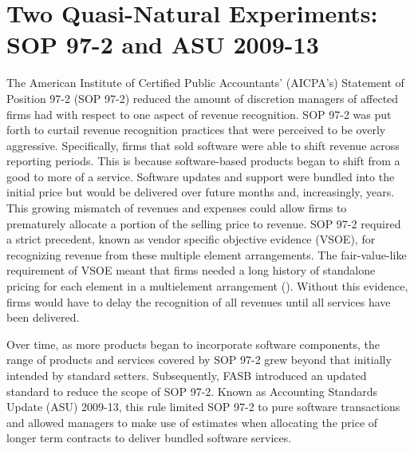 \documentclass[thesis]{thesis-umich}
\begin{document}
\section{Two Quasi-Natural Experiments: SOP 97-2 and ASU 2009-13}\label{sec:experiments}
The American Institute of Certified Public Accountants' (AICPA's) Statement of Position 97-2 (SOP 97-2) reduced the amount of discretion managers of affected firms had with respect to one aspect of revenue recognition. 
SOP 97-2 was put forth to curtail revenue recognition practices that were perceived to be overly aggressive. Specifically, firms that sold software were able to shift revenue across reporting periods. This is because software-based products began to shift from a good to more of a service. Software updates and support were bundled into the initial price but would be delivered over future months and, increasingly, years. This growing mismatch of revenues and expenses could allow firms to prematurely allocate a portion of the selling price to revenue. SOP 97-2 required a strict precedent, known as vendor specific objective evidence (VSOE), for recognizing revenue from these multiple element arrangements. The fair-value-like requirement of VSOE meant that firms needed a long history of standalone pricing for each element in a multielement arrangement (\cite{cfo2008}). Without this evidence, firms would have to delay the recognition of all revenues until all services have been delivered.

Over time, as more products began to incorporate software components, the range of products and services covered by SOP 97-2 grew beyond that initially intended by standard setters. Subsequently, FASB introduced an updated standard to reduce the scope of SOP 97-2. Known as Accounting Standards Update (ASU) 2009-13, this rule limited SOP 97-2 to pure software transactions and allowed managers to make use of estimates when allocating the price of longer term contracts to deliver bundled software services.
\end{document}
